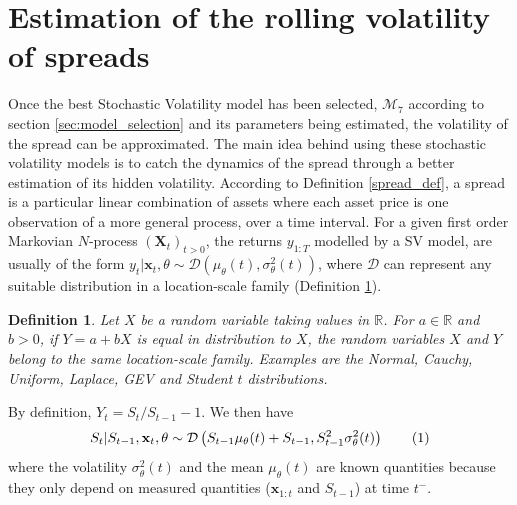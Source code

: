 \documentclass[11pt,a4,twosided,singlespacing,titlepagenumber=on]{scrreprt}
\numberwithin{equation}{chapter} %
\newtheorem{definition}[theorem]{Definition}%
\theoremstyle{remark}
\newcommand{\matr}[1]{\mathbf{#1}}
\newcommand\numberthis{\addtocounter{equation}{1}\tag{\theequation}}
\begin{document}
\section{Estimation of the rolling volatility of spreads}
\label{sec:estimation_bollinger_bands_sv}
Once the best Stochastic Volatility model has been selected, $\mathcal{M}_7$ according to section \ref{sec:model_selection} and its parameters being estimated, the volatility of the spread can be approximated. The main idea behind using these stochastic volatility models is to catch the dynamics of the spread through a better estimation of its hidden volatility. According to Definition \ref{spread_def}, a spread is a particular linear combination of assets where each asset price is one observation of a more general process, over a time interval. For a given first order Markovian $N$-process $(\matr{X}_t)_{t>0}$, the returns $y_{1:T}$ modelled by a SV model, are usually of the form $y_t | \matr{x}_t, \theta \sim \mathcal{D} \left( \mu_\theta(t), \sigma_\theta^2(t) \right)$, where $\mathcal{D}$ can represent any suitable distribution in a location-scale family (Definition \ref{location_scale_family}).

\begin{definition}
\label{location_scale_family}
Let $X$ be a random variable taking values in $\mathbb{R}$. For $a \in \mathbb{R}$ and $b > 0$, if $Y = a + b X$ is equal in distribution to $X$, the random variables $X$ and $Y$ belong to the same location-scale family. Examples are the Normal, Cauchy, Uniform, Laplace, GEV and Student $t$ distributions.
\end{definition}

By definition, $Y_t = S_t / S_{t-1} - 1$. We then have
\begin{equation}
S_t | S_{t-1}, \matr{x}_t, \theta \sim \mathcal{D} \left(S_{t-1} \mu_\theta(t)+S_{t-1}, S_{t-1}^2 \sigma_\theta^2(t) \right) \numberthis \label{equation_price_vol}
\end{equation}
where the volatility $\sigma_\theta^2(t)$ and the mean $\mu_\theta(t)$ are known quantities because they only depend on measured quantities ($\matr{x}_{1:t}$ and $S_{t-1}$) at time $t^-$.
\end{document}
